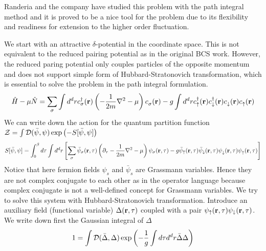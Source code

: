 \label{sec:pathInt}
Randeria and the company have studied this problem with the path integral method and it is proved to be a  nice tool for the problem due to its flexibility and readiness for extension to the higher order fluctuation.  

We start with an attractive $\delta$-potential in the coordinate space.  This is not equivalent to the  reduced pairing potential as in the original BCS work.  However, the reduced paring potential only couples  particles of the opposite momentum and does not support simple form of Hubbard-Stratonovich transformation, which is essential to solve the problem in the path integral formulation.  
\begin{equation}
\hat{H}-\mu\hat{N}=\sum_{\sigma}\int{d^{d}r}c^{\dagger}_{\sigma}(\mathbf{r})\left(-\frac{1}{2m}\nabla^{2}-\mu\right)c^{}_{\sigma}(\mathbf{r})-g\int{d^{d}r}c^{\dagger}_{\uparrow}(\mathbf{r})c^{\dagger}_{\downarrow}(\mathbf{r})c^{}_{\downarrow}(\mathbf{r})c^{}_{\uparrow}(\mathbf{r})
\end{equation}
 We can write down the action for the quantum partition function $\mathcal{Z}=\int{\ensuremath{\mathcal{D}}(\bar\psi,\psi)\exp\ensuremath{\left(-S[\bar\psi,\psi]\right)}}$
\begin{equation}\label{eq:pathInt2:actionPsi}
S[\bar\psi,\psi]=\int^{\beta}_{0}d\tau\int{d^{d}r}\left[\sum_{\sigma}\bar\psi_{\sigma}(\mathbf{r},\tau)\left(\partial_{\tau}-\frac{1}{2m}\nabla^{2}-\mu\right)\psi_{\sigma}(\mathbf{r},\tau)-g\bar\psi_{\uparrow}(\mathbf{r},\tau)\bar\psi_{\downarrow}(\mathbf{r},\tau)\psi^{}_{\downarrow}(\mathbf{r},\tau)\psi^{}_{\uparrow}(\mathbf{r},\tau)\right]
\end{equation}
Notice that here fermion fields $\psi_{s}$ and $\bar\psi_{s}$ are Grassmann variables. Hence  they are not complex conjugate to each other as in the operator language because  complex conjugate is not a well-defined concept for Grassmann variables. 
We try to solve this system with Hubbard-Stratonovich transformation.   Introduce an auxiliary field (functional variable) $\Delta(\mathbf{r},\tau)$ coupled with a pair $\psi_{\uparrow}(\mathbf{r},\tau)\psi_{\downarrow}(\mathbf{r},\tau)$. %
We write down first the Gaussian integral of $\Delta$
\begin{equation}
1=\int{\ensuremath{\mathcal{D}}(\bar\Delta,\Delta)}\exp\left(-\frac{1}{g}\int{d\tau{d}^{d}r}\bar\Delta\Delta\right)
\end{equation}
